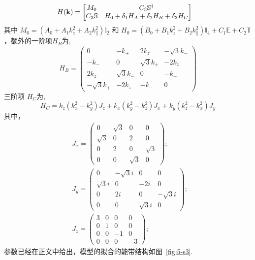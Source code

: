 \begin{equation*}
    \begin{split}
        &H({\bf k}) = \begin{bmatrix}
            M_0& C_3{\mathbb S}^\dagger \\
            C_3{\mathbb S} & H_0+\delta_1 H_A+\delta_2 H_B +\delta_3H_C
        \end{bmatrix}
    \end{split}
\end{equation*}
其中 $M_0=\left(A_0+A_1k_z^2+A_2k_{||}^2\right) {\mathbb I}_{2}$ 和 $H_0=\left(B_0+B_1k_z^2+B_2k_{||}^2\right){\mathbb I}_{4}+C_1 {\mathbb E}+C_2{\mathbb T}$ ，额外的一阶项$H_B$为,
\begin{equation}
  H_B = \begin{pmatrix}
      0 & -k_+ & 2k_z & -\sqrt{3}k_- \\
      -k_- & 0 & \sqrt{3}k_+ & -2k_z \\
      2k_z & \sqrt{3}k_- & 0 & -k_+ \\
      -\sqrt{3}k_+ & -2k_z & -k_- & 0
  \end{pmatrix}
\end{equation}
三阶项 $H_C$为,
\begin{equation}
    H_{C}= k_z(k_x^2-k_y^2)J_z+ k_x(k_y^2-k_z^2)J_x+ k_y(k_z^2-k_x^2)J_y
\end{equation}
其中，
\begin{equation}
\begin{split}
&    J_x=\begin{pmatrix}
       0 & \sqrt{3} & 0 & 0\\
       \sqrt{3} & 0 & 2 & 0\\
       0 & 2 & 0 & \sqrt{3}\\
       0 & 0 & \sqrt{3} & 0
    \end{pmatrix};~\\
 &   J_y=\begin{pmatrix}
       0 & -\sqrt{3}i & 0 & 0\\
       \sqrt{3}i & 0 & -2i & 0\\
       0 & 2i & 0 & -\sqrt{3}i\\
       0 & 0 & \sqrt{3}i & 0
    \end{pmatrix};~\\
&    J_z=\begin{pmatrix}
       3 & 0 & 0 & 0\\
       0 & 1 & 0 & 0\\
       0 & 0 &-1 & 0\\
       0 & 0 & 0 &-3
    \end{pmatrix};~
    \end{split}
\end{equation}
%
参数已经在正文中给出，模型的拟合的能带结构如图~\ref{fig:5-s3}.







